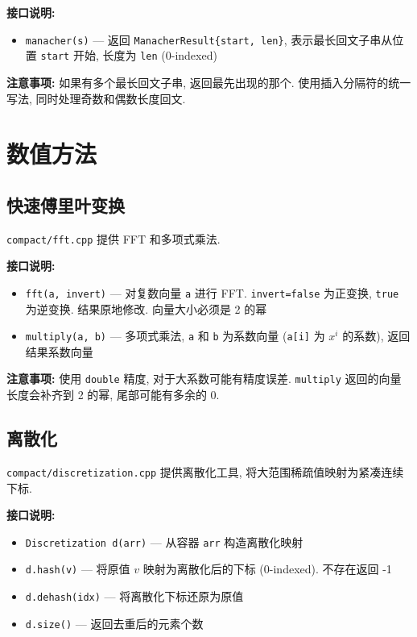 \documentclass[a4paper]{ctexbook}
\begin{document}
\textbf{接口说明:}
\begin{itemize}
	\item \texttt{manacher(s)} — 返回 \texttt{ManacherResult\{start, len\}}, 表示最长回文子串从位置 \texttt{start} 开始, 长度为 \texttt{len} (0-indexed)
\end{itemize}

\textbf{注意事项:} 如果有多个最长回文子串, 返回最先出现的那个. 使用插入分隔符的统一写法, 同时处理奇数和偶数长度回文.



\section{数值方法}

\subsection{快速傅里叶变换}

\texttt{compact/fft.cpp} 提供 FFT 和多项式乘法.

\textbf{接口说明:}
\begin{itemize}
	\item \texttt{fft(a, invert)} — 对复数向量 \texttt{a} 进行 FFT. \texttt{invert=false} 为正变换, \texttt{true} 为逆变换. 结果原地修改. 向量大小必须是 2 的幂
	\item \texttt{multiply(a, b)} — 多项式乘法, \texttt{a} 和 \texttt{b} 为系数向量 (\texttt{a[i]} 为 $x^i$ 的系数), 返回结果系数向量
\end{itemize}

\textbf{注意事项:} 使用 \texttt{double} 精度, 对于大系数可能有精度误差. \texttt{multiply} 返回的向量长度会补齐到 2 的幂, 尾部可能有多余的 0.



\subsection{离散化}

\texttt{compact/discretization.cpp} 提供离散化工具, 将大范围稀疏值映射为紧凑连续下标.

\textbf{接口说明:}
\begin{itemize}
	\item \texttt{Discretization d(arr)} — 从容器 \texttt{arr} 构造离散化映射
	\item \texttt{d.hash(v)} — 将原值 $v$ 映射为离散化后的下标 (0-indexed). 不存在返回 -1
	\item \texttt{d.dehash(idx)} — 将离散化下标还原为原值
	\item \texttt{d.size()} — 返回去重后的元素个数
\end{itemize}
\end{document}
